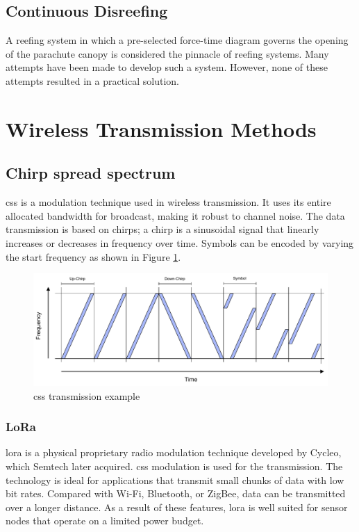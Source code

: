 \subsection{Continuous Disreefing}
A reefing system in which a pre-selected force-time diagram governs the opening of the parachute canopy is considered the pinnacle of reefing systems. Many attempts have been made to develop such a system. However, none of these attempts resulted in a practical solution.\cite[Chapter~5.6]{parachute-design}

\newpage

\section{Wireless Transmission Methods}

\subsection{Chirp spread spectrum}
\acrfull{css} is a modulation technique used in wireless transmission. It uses its entire allocated bandwidth for broadcast, making it robust to channel noise. The data transmission is based on chirps; a chirp is a sinusoidal signal that linearly increases or decreases in frequency over time. Symbols can be encoded by varying the start frequency as shown in Figure \ref{fig:css}.\cite{css-wiki}

\begin{figure}[h!]
	\centering
	\includegraphics[width=\textwidth]{images/css}
	\caption{\acrshort{css} transmission example}
	\label{fig:css}
\end{figure}

\subsubsection{LoRa}
\acrshort{lora} is a physical proprietary radio modulation technique developed by Cycleo, which Semtech later acquired. \acrfull{css} modulation is used for the transmission. The technology is ideal for applications that transmit small chunks of data with low bit rates. Compared with Wi-Fi, Bluetooth, or ZigBee, data can be transmitted over a longer distance. As a result of these features, \acrshort{lora} is well suited for sensor nodes that operate on a limited power budget.\cite{lora-ttn}

